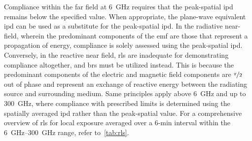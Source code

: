 Compliance within the far field at \SI{6}{\GHz} requires that the peak-spatial \gls{ipd} remains below the specified value.
When appropriate, the plane-wave equivalent \gls{ipd} can be used as a substitute for the peak-spatial \gls{ipd}.
In the radiative near-field, wherein the predominant components of the \gls{emf} are those that represent a propagation of energy, compliance is solely assessed using the peak-spatial \gls{ipd}.
Conversely, in the reactive near field, \gls{rl}s are inadequate for demonstrating compliance altogether, and \gls{br}s must be utilized instead.
This is because the predominant components of the electric and magnetic field components are $\nicefrac{\pi}{2}$ out of phase and represent an exchange of reactive energy between the radiating source and surrounding medium.
Same principles apply above \SI{6}{\GHz} and up to \SI{300}{\GHz}, where compliance with prescribed limits is determined using the spatially averaged \gls{ipd} rather than the peak-spatial value.
For a comprehensive overview of \gls{rl}s for local exposure averaged over a 6-min interval within the \SIrange{6}{300}{\GHz} range, refer to~\cref{tab:rls}.
